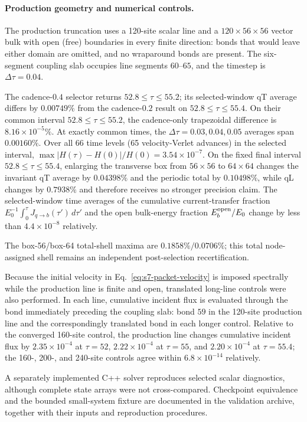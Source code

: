 \documentclass[10pt,aps,onecolumn,notitlepage,nofootinbib]{revtex4-2}
\begin{document}
\paragraph*{Production geometry and numerical controls.}
The production truncation uses a 120-site scalar line and a $120\times56\times56$ vector bulk with open (free) boundaries in every finite direction: bonds that would leave either domain are omitted, and no wraparound bonds are present. The six-segment coupling slab occupies line segments $60$--$65$, and the timestep is $\Delta\tau=0.04$.

The cadence-$0.4$ selector returns $52.8\leq\tau\leq55.2$; its selected-window qT average differs by $0.00749\%$ from the cadence-$0.2$ result on $52.8\leq\tau\leq55.4$. On their common interval $52.8\leq\tau\leq55.2$, the cadence-only trapezoidal difference is $8.16\times10^{-5}\%$.  At exactly common times, the $\Delta\tau=0.03,0.04,0.05$ averages span $0.00160\%$.  Over all 66 time levels (65 velocity-Verlet advances) in the selected interval, $\max |H(\tau)-H(0)|/H(0)=3.54\times10^{-7}$.  On the fixed final interval $52.8\leq\tau\leq55.4$, enlarging the transverse box from $56\times56$ to $64\times64$ changes the invariant qT average by $0.04398\%$ and the periodic total by $0.10498\%$, while qL changes by $0.7938\%$ and therefore receives no stronger precision claim. The selected-window time averages of the cumulative current-transfer fraction $E_0^{-1}\int_0^\tau J_{q\to b}(\tau')\,d\tau'$ and the open bulk-energy fraction $E_b^{\rm open}/E_0$ change by less than $4.4\times10^{-8}$ relatively.

The box-56/box-64 total-shell maxima are $0.1858\%/0.0706\%$; this total node-assigned shell remains an independent post-selection recertification.

Because the initial velocity in Eq.~\eqref{eq:s7-packet-velocity} is imposed spectrally while the production line is finite and open, translated long-line controls were also performed. In each line, cumulative incident flux is evaluated through the bond immediately preceding the coupling slab: bond $59$ in the 120-site production line and the correspondingly translated bond in each longer control. Relative to the converged 160-site control, the production line changes cumulative incident flux by $2.35\times10^{-4}$ at $\tau=52$, $2.22\times10^{-4}$ at $\tau=55$, and $2.20\times10^{-4}$ at $\tau=55.4$; the 160-, 200-, and 240-site controls agree within $6.8\times10^{-14}$ relatively.

A separately implemented C++ solver reproduces selected scalar diagnostics, although complete state arrays were not cross-compared. Checkpoint equivalence and the bounded small-system fixture are documented in the validation archive, together with their inputs and reproduction procedures.
\end{document}
